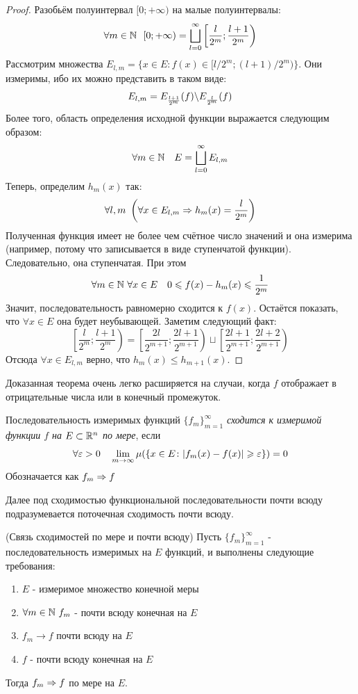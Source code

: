 \begin{proof}
	Разобьём полуинтервал $[0; +\infty)$ на малые полуинтервалы:
	\[
		\forall m \in \N\ \ [0; +\infty) = \bscup_{l = 0}^\infty \left[\frac{l}{2^m}; \frac{l + 1}{2^m}\right)
	\]
	Рассмотрим множества $E_{l, m} = \{x \in E \colon f(x) \in [l / 2^m; (l + 1) / 2^m)\}$. Они измеримы, ибо их можно представить в таком виде:
	\[
		E_{l, m} = E_{\frac{l + 1}{2^m}}(f) \backslash E_{\frac{l}{2^m}}(f)
	\]
	Более того, область определения исходной функции выражается следующим образом:
	\[
		\forall m \in \mathbb{N} \quad E = \bigsqcup_{l = 0}^\infty E_{l, m}
	\]
	Теперь, определим $h_m(x)$ так:
	\[
		\forall l, m\ \left(\forall x \in E_{l, m} \Rightarrow h_m(x) = \frac{l}{2^m}\right)
	\]
	Полученная функция имеет не более чем счётное число значений и она измерима (например, потому что записывается в виде ступенчатой функции). Следовательно, она ступенчатая. При этом
	\[
		\forall m \in \N\ \forall x \in E \quad 0 \le f(x) - h_m(x) \le \frac{1}{2^m}
	\]
	Значит, последовательность равномерно сходится к $f(x)$. Остаётся показать, что $\forall x \in E$ она будет неубывающей. Заметим следующий факт:
	\[
		\left[\frac{l}{2^m}; \frac{l + 1}{2^m}\right) = \left[\frac{2l}{2^{m + 1}}; \frac{2l + 1}{2^{m + 1}}\right) \sqcup \left[\frac{2l + 1}{2^{m + 1}}; \frac{2l + 2}{2^{m + 1}}\right)
	\]
	Отсюда $\forall x \in E_{l, m}$ верно, что $h_m(x) \le h_{m + 1}(x)$.
\end{proof}

\begin{note}
	Доказанная теорема очень легко расширяется на случаи, когда $f$ отображает в отрицательные числа или в конечный промежуток.
\end{note}

\begin{definition}
	Последовательность измеримых функций $\{f_m\}_{m = 1}^\infty$ \textit{сходится к измеримой функции $f$ на $E \subset \mathbb{R}^n$ по мере}, если
	\[
		\forall \varepsilon > 0 \quad \lim_{m \to \infty} \mu(\{x \in E \colon |f_m(x) - f(x)| \geqslant \varepsilon\}) = 0
	\]
	Обозначается как $f_m \Rightarrow f$
\end{definition}

\begin{note}
	Далее под сходимостью функциональной последовательности почти всюду подразумевается поточечная сходимость почти всюду.
\end{note}

\begin{theorem} (Связь сходимостей по мере и почти всюду) \label{th2}
	Пусть $\{f_m\}_{m = 1}^\infty$ - последовательность измеримых на $E$ функций, и выполнены следующие требования:
	\begin{enumerate}
		\item $E$ - измеримое множество конечной меры
		
		\item $\forall m \in \mathbb{N}\ f_m$ - почти всюду конечная на $E$
		
		\item $f_m \to f$ почти всюду на $E$
		
		\item $f$ - почти всюду конечная на $E$
	\end{enumerate}
	Тогда $f_m \Rightarrow f$ по мере на $E$.
\end{theorem}


